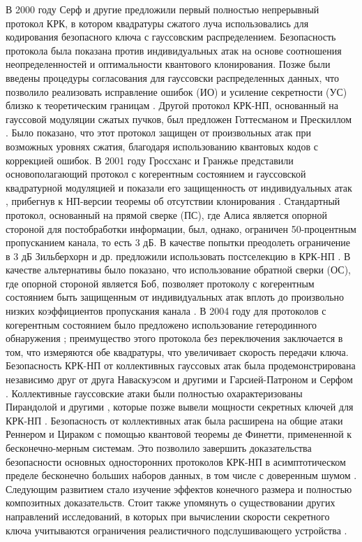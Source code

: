 В 2000 году Серф и другие \cite{cerf2001} предложили первый полностью непрерывный протокол КРК, в котором квадратуры сжатого луча использовались для кодирования безопасного ключа с гауссовским распределением. Безопасность протокола была показана против индивидуальных атак на основе соотношения неопределенностей и оптимальности квантового клонирования. Позже были введены процедуры согласования для гауссовски распределенных данных, что позволило реализовать исправление ошибок (ИО) и усиление секретности (УС)  близко к теоретическим границам \cite{vanassche2004}. Другой протокол КРК-НП, основанный на гауссовой модуляции сжатых пучков, был предложен Готтесманом и Прескиллом \cite{gottesman2001}. Было показано, что этот протокол защищен от произвольных атак при возможных уровнях сжатия, благодаря использованию квантовых кодов с коррекцией ошибок. В 2001 году Гроссханс и Гранжье представили основополагающий протокол с когерентным состоянием и гауссовской квадратурной модуляцией и показали его защищенность от индивидуальных атак \cite{grosshans2002}, прибегнув к НП-версии теоремы об отсутствии клонирования \cite{grosshans2001}. Стандартный протокол, основанный на прямой сверке (ПС), где Алиса является опорной стороной для постобработки информации, был, однако, ограничен 50-процентным пропусканием канала, то есть 3 дБ. В качестве попытки преодолеть ограничение в 3 дБ Зильберхорн и др. предложили использовать постселекцию в КРК-НП \cite{silberhorn2002}. В качестве альтернативы было показано, что использование обратной сверки (ОС), где опорной стороной является Боб, позволяет протоколу с когерентным состоянием быть защищенным от индивидуальных атак вплоть до произвольно низких коэффициентов пропускания канала \cite{grosshans2002a}. В 2004 году для протоколов с когерентным состоянием было предложено использование гетеродинного обнаружения \cite{weedbrook2004}; преимущество этого протокола без переключения заключается в том, что измеряются обе квадратуры, что увеличивает скорость передачи ключа. Безопасность КРК-НП от коллективных гауссовых атак была продемонстрирована независимо друг от друга Наваскуэсом и другими \cite{navascus2006} и Гарсией-Патроном и Серфом \cite{GarciaPatron2006}. Коллективные гауссовские атаки были полностью охарактеризованы Пирандолой и другими \cite{pirandola2008}, которые позже вывели мощности секретных ключей для КРК-НП \cite{pirandola2017,pirandola2009}. Безопасность от коллективных атак была расширена на общие атаки Реннером и Цираком \cite{renner2009} с помощью квантовой теоремы де Финетти, примененной к бесконечно-мерным системам. Это позволило завершить доказательства безопасности основных односторонних протоколов КРК-НП в асимптотическом пределе бесконечно больших наборов данных, в том числе с доверенным шумом \cite{pirandola2014, usenko2016, laudenbach2019}. Следующим развитием стало изучение эффектов конечного размера и полностью композитных доказательств. Стоит также упомянуть о существовании других направлений исследований, в которых при вычислении скорости секретного ключа учитываются ограничения реалистичного подслушивающего устройства \cite{hosseinidehaj2019, pan2020}.
